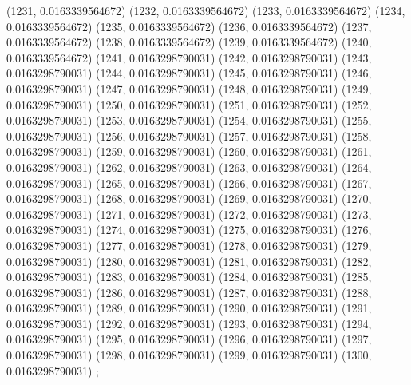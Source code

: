 {					(1231, 0.0163339564672)
					(1232, 0.0163339564672)
					(1233, 0.0163339564672)
					(1234, 0.0163339564672)
					(1235, 0.0163339564672)
					(1236, 0.0163339564672)
					(1237, 0.0163339564672)
					(1238, 0.0163339564672)
					(1239, 0.0163339564672)
					(1240, 0.0163339564672)
					(1241, 0.0163298790031)
					(1242, 0.0163298790031)
					(1243, 0.0163298790031)
					(1244, 0.0163298790031)
					(1245, 0.0163298790031)
					(1246, 0.0163298790031)
					(1247, 0.0163298790031)
					(1248, 0.0163298790031)
					(1249, 0.0163298790031)
					(1250, 0.0163298790031)
					(1251, 0.0163298790031)
					(1252, 0.0163298790031)
					(1253, 0.0163298790031)
					(1254, 0.0163298790031)
					(1255, 0.0163298790031)
					(1256, 0.0163298790031)
					(1257, 0.0163298790031)
					(1258, 0.0163298790031)
					(1259, 0.0163298790031)
					(1260, 0.0163298790031)
					(1261, 0.0163298790031)
					(1262, 0.0163298790031)
					(1263, 0.0163298790031)
					(1264, 0.0163298790031)
					(1265, 0.0163298790031)
					(1266, 0.0163298790031)
					(1267, 0.0163298790031)
					(1268, 0.0163298790031)
					(1269, 0.0163298790031)
					(1270, 0.0163298790031)
					(1271, 0.0163298790031)
					(1272, 0.0163298790031)
					(1273, 0.0163298790031)
					(1274, 0.0163298790031)
					(1275, 0.0163298790031)
					(1276, 0.0163298790031)
					(1277, 0.0163298790031)
					(1278, 0.0163298790031)
					(1279, 0.0163298790031)
					(1280, 0.0163298790031)
					(1281, 0.0163298790031)
					(1282, 0.0163298790031)
					(1283, 0.0163298790031)
					(1284, 0.0163298790031)
					(1285, 0.0163298790031)
					(1286, 0.0163298790031)
					(1287, 0.0163298790031)
					(1288, 0.0163298790031)
					(1289, 0.0163298790031)
					(1290, 0.0163298790031)
					(1291, 0.0163298790031)
					(1292, 0.0163298790031)
					(1293, 0.0163298790031)
					(1294, 0.0163298790031)
					(1295, 0.0163298790031)
					(1296, 0.0163298790031)
					(1297, 0.0163298790031)
					(1298, 0.0163298790031)
					(1299, 0.0163298790031)
					(1300, 0.0163298790031)
				};
